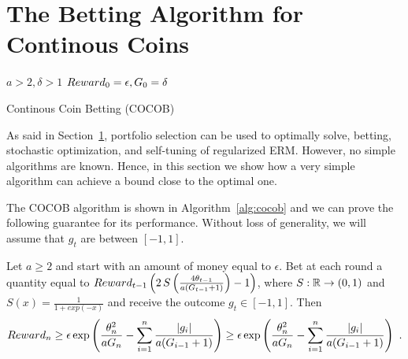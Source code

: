 \section{The Betting Algorithm for Continous Coins}

\begin{algorithm}[t]
  \begin{algorithmic}
  {
     $a>2,\delta>1$
     $Reward_0=\epsilon,G_0=\delta$
    \ENDFOR
  }
  \end{algorithmic}
  \caption{Continous Coin Betting (COCOB)}
  \label{alg:cocob}
\end{algorithm}

As said in Section~\ref{}, portfolio selection can be used to optimally solve, betting, stochastic optimization, and self-tuning of regularized \ac{ERM}. However, no simple algorithms are known.
Hence, in this section we show how a very simple algorithm can achieve a bound close to the optimal one.

The \ac{COCOB} algorithm is shown in Algorithm~\ref{alg:cocob} and we can prove the following guarantee for its performance.
Without loss of generality, we will assume that $g_t$ are between $[-1,1]$.
%
\begin{theorem}
\label{theo:cocob}
Let $a\geq2$ and start with an amount of money equal to $\epsilon$. Bet at each round a quantity equal to
$Reward_{t-1} \left(2 \, S\left(\frac{4 \theta_{t-1}}{a (G_{t-1} + 1)}\right)-1\right)$, where $S:\mathbb{R}\rightarrow(0,1)$ and $S(x)=\frac{1}{1+exp(-x)}$ and receive the outcome $g_t \in [-1,1]$. Then
\begin{align*}
Reward_{n} 
\geq \epsilon \exp\left(\frac{\theta_{n}^2}{a G_{n}} - \sum_{i=1}^{n} \frac{|g_i|}{a( G_{i-1} + 1) } \right)
\geq \epsilon \exp\left(\frac{\theta_{n}^2}{a G_{n}} - \sum_{i=1}^{n} \frac{|g_i|}{a( G_{i-1} + 1) } \right)~.
\end{align*}
\end{theorem}
%
